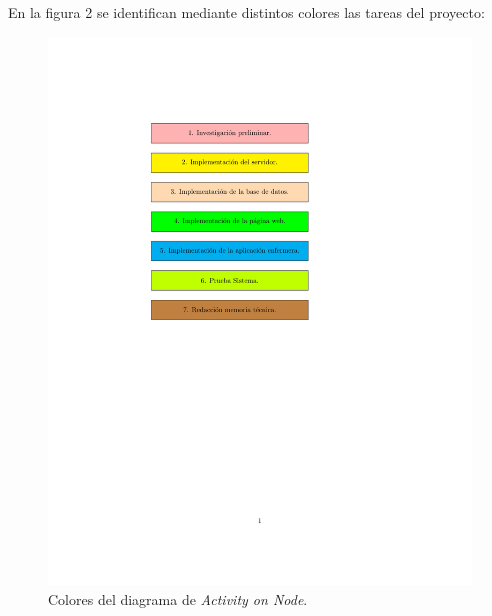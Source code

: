 \documentclass[
11pt, %
]{charter}
\begin{document}


En la figura 2 se identifican mediante distintos colores las tareas del proyecto:

\begin{figure}[htpb]
\centering 
\includegraphics[width=1.5\textwidth]{./Figuras/digramaonnode.pdf}
\caption{Colores del diagrama de \textit{Activity on Node}.}
\label{fig:AoN0}

\end{figure}
\end{document}
